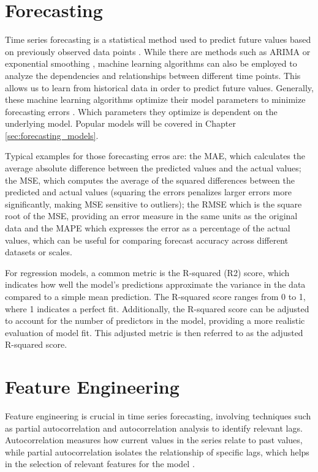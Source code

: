 \section{Forecasting}
\label{sec:Forecasting}
Time series forecasting is a statistical method used to predict future values based
on previously observed data points \parencite[ch. 5]{box2015time}. While there are
methods such as \ac{ARIMA} or exponential smoothing \parencite[ch. 5]{box2015time},
machine learning algorithms can also be employed to analyze the dependencies and
relationships between different time points. This allows us to learn from historical
data in order to predict future values. Generally, these machine learning algorithms
optimize their model parameters to minimize
forecasting errors \parencite[ch. 5]{box2015time}. Which parameters they optimize is
dependent on the underlying model. Popular models will be covered in Chapter
\ref{sec:forecasting_models}.

Typical examples for those forecasting erros are: the \ac{MAE}, which calculates
the average absolute difference between the predicted values and the actual values;
the \ac{MSE}, which computes the average of the squared differences between the
predicted and actual values (squaring the errors penalizes larger errors more
significantly, making MSE sensitive to outliers); the \ac{RMSE} which is the
square root of the \ac{MSE}, providing an error measure in the same units as
the original data and the \ac{MAPE} which expresses the error as a percentage
of the actual values, which can be useful for comparing forecast accuracy across
different datasets or scales.

For regression models, a common metric is the R-squared (R2) score, which
indicates how well the model's predictions approximate the variance in the data compared
to a simple mean prediction. The R-squared score ranges from 0 to 1, where 1
indicates a perfect fit. Additionally, the R-squared score can be adjusted to
account for the number of predictors in the model, providing a more realistic
evaluation of model fit. This adjusted metric is then referred to as the adjusted
R-squared score.

\section{Feature Engineering}
Feature engineering is crucial in time series forecasting, involving techniques
such as partial autocorrelation and autocorrelation analysis to identify relevant
lags. Autocorrelation measures how current values in the series relate to past values,
while partial autocorrelation isolates the relationship of specific lags, which helps
in the selection of relevant features for the model \parencite{box2015time}.

